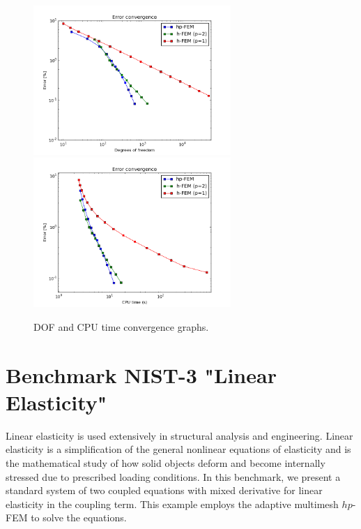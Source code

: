 \documentclass[12pt]{elsarticle}
\begin{document}
\begin{figure}[H]
\centering
\hspace{-50mm}
\includegraphics[width=7.5cm]{nist/nist-2/conv_dof_aniso.png}\ \
\hspace{-10mm}
\includegraphics[width=7.5cm]{nist/nist-2/conv_cpu_aniso.png}
\hspace{-50mm}
\caption{DOF and CPU time convergence graphs.}
\label{fig:nist-2-conv}
\end{figure}


\section{Benchmark NIST-3 "Linear Elasticity"}
\label{sec:bench-3}

Linear elasticity is used extensively in structural analysis
and engineering. Linear elasticity is a simplification
of the general nonlinear equations of elasticity and is the mathematical
study of how solid objects deform and become internally
stressed due to prescribed loading conditions.
In this benchmark, we present a standard system of two
coupled equations with mixed derivative for linear elasticity
in the coupling term. This example employs the adaptive multimesh $hp$-FEM
to solve the equations.
\end{document}
